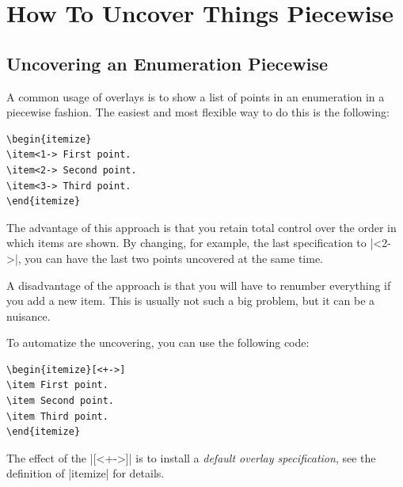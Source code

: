 %
%
%

\section{How To Uncover Things Piecewise}


\subsection{Uncovering an Enumeration Piecewise}

A common usage of overlays is to show a list of points in an enumeration in a piecewise fashion. The easiest and most flexible way to do this is the following:
\begin{verbatim}
\begin{itemize}
\item<1-> First point.
\item<2-> Second point.
\item<3-> Third point.
\end{itemize}
\end{verbatim}

The advantage of this approach is that you retain total control over the order in which items are shown. By changing, for example, the last specification to |<2->|, you can have the last two points uncovered at the same time.

A disadvantage of the approach is that you will have to renumber everything if you add a new item. This is usually not such a big problem, but it can be a nuisance.

To automatize the uncovering, you can use the following code:
\begin{verbatim}
\begin{itemize}[<+->]
\item First point.
\item Second point.
\item Third point.
\end{itemize}
\end{verbatim}

The effect of the |[<+->]| is to install a \emph{default overlay specification}, see the definition of |itemize| for details.

